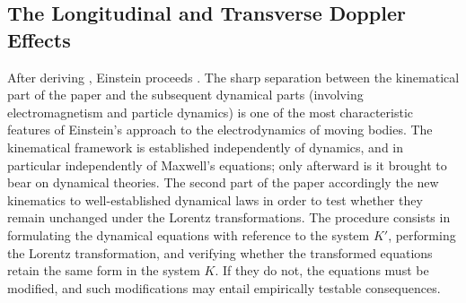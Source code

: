 \documentclass[submitted,12pt]{article}
\begin{document}



\subsection{The Longitudinal and Transverse Doppler Effects}
%
After deriving , Einstein proceeds  \citep[907]{Einstein1905}. The sharp separation between the kinematical part of the paper and the subsequent dynamical parts (involving electromagnetism and particle dynamics) is one of the most characteristic features of Einstein’s approach to the electrodynamics of moving bodies. The kinematical framework is established independently of dynamics, and in particular independently of Maxwell’s equations; only afterward is it brought to bear on dynamical theories. The second part of the paper accordingly  the new kinematics to well-established dynamical laws in order to test whether they remain unchanged under the Lorentz transformations. The procedure consists in formulating the dynamical equations with reference to the  system $K'$, performing the Lorentz transformation, and verifying whether the transformed equations retain the same form in the  system $K$. If they do not, the equations must be modified, and such modifications may entail empirically testable consequences.

\end{document}
